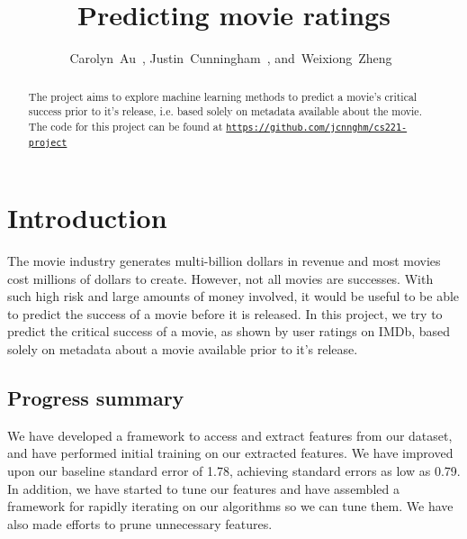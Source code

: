 \documentclass[journal]{IEEEtran}
\begin{document}
%
\title{Predicting movie ratings}


\author{Carolyn~Au~,
        Justin~Cunningham~,
        and~Weixiong~Zheng~}


%
{}


\maketitle


\begin{abstract}
The project aims to explore machine learning methods to predict a movie's critical success prior
to it's release, i.e. based solely on metadata available about the movie. The code for this project
can be found at \texttt{\url{https://github.com/jcnnghm/cs221-project}}
\end{abstract}



\section{Introduction}
The movie industry generates multi-billion dollars in revenue and most movies
cost millions of dollars to create.  However, not all movies are successes.
With such high risk and large amounts of money involved, it would be useful to
be able to predict the success of a movie before it is released. In this
project, we try to predict the critical success of a movie, as shown by user
ratings on IMDb, based solely on metadata about a movie available prior to it's
release.

\subsection{Progress summary}
We have developed a framework to access and extract features from our dataset,
and have performed initial training on our extracted features.  We have improved 
upon our baseline standard error of 1.78, achieving standard errors as low as 0.79.
In addition, we have started to tune our features and have assembled a framework for
rapidly iterating on our algorithms so we can tune them.  We have also made efforts 
to prune unnecessary features.
\end{document}
